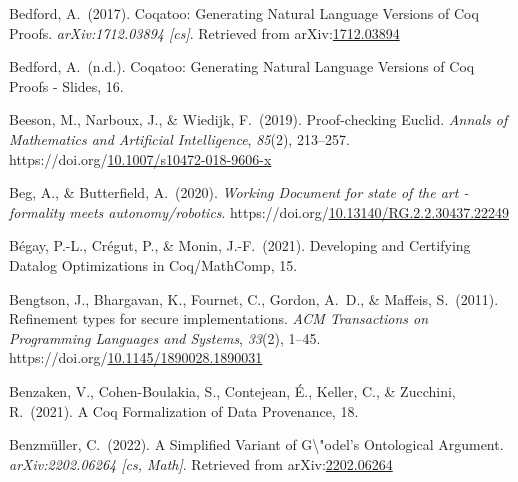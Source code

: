 \documentclass[12pt,twoside]{article}
\begin{document}
{\begin{thebibliography}{1079}
\mdbibitemlabel{}Bedford, A.~(2017). Coqatoo: Generating Natural Language Versions of Coq Proofs. \emph{arXiv:1712.03894 {}[cs]}. Retrieved from arXiv:\href{http://arxiv.org/abs/1712.03894}{1712.03894}%

\mdbibitemlabel{}Bedford, A.~(n.d.). Coqatoo: Generating Natural Language Versions of Coq Proofs - Slides, 16.%

\mdbibitemlabel{}Beeson, M., Narboux, J., \& Wiedijk, F.~(2019). Proof-checking Euclid. \emph{Annals of Mathematics and Artificial Intelligence}, \emph{85}(2), 213–257. https://doi.org/\href{https://dx.doi.org/10.1007/s10472-018-9606-x}{10.1007/s10472-018-9606-x}%

\mdbibitemlabel{}Beg, A., \& Butterfield, A.~(2020). \emph{Working Document for state of the art - formality meets autonomy/robotics}. https://doi.org/\href{https://dx.doi.org/10.13140/RG.2.2.30437.22249}{10.13140/RG.2.2.30437.22249}%

\mdbibitemlabel{}Bégay, P.-L., Crégut, P., \& Monin, J.-F.~(2021). Developing and Certifying Datalog Optimizations in Coq/MathComp, 15.%

\mdbibitemlabel{}Bengtson, J., Bhargavan, K., Fournet, C., Gordon, A.~D., \& Maffeis, S.~(2011). Refinement types for secure implementations. \emph{ACM Transactions on Programming Languages and Systems}, \emph{33}(2), 1–45. https://doi.org/\href{https://dx.doi.org/10.1145/1890028.1890031}{10.1145/1890028.1890031}%

\mdbibitemlabel{}Benzaken, V., Cohen-Boulakia, S., Contejean, É., Keller, C., \& Zucchini, R.~(2021). A Coq Formalization of Data Provenance, 18.%

\mdbibitemlabel{}Benzmüller, C.~(2022). A Simplified Variant of G\textbackslash{}"odel’s Ontological Argument. \emph{arXiv:2202.06264 {}[cs, Math]}. Retrieved from arXiv:\href{http://arxiv.org/abs/2202.06264}{2202.06264}%


\end{thebibliography}}
\end{document}
